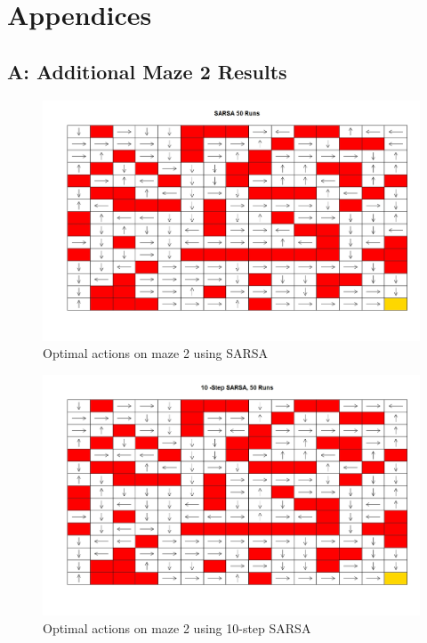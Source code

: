 \documentclass[final,12pt,3p]{elsarticle}
\begin{document}
\newpage

\section{Appendices}
\subsection{A: Additional Maze 2 Results}

\begin{figure}[H]
    \centering
    \caption{Optimal actions on maze 2 using SARSA}
    \includegraphics[width=13cm]{figures/Maps/Maze2/SARSAMapMaze2.jpeg}
\end{figure}

\begin{figure}[H]
    \centering
    \caption{Optimal actions on maze 2 using 10-step SARSA}
    \includegraphics[width=13cm]{figures/Maps/Maze2/10StepSARSAMapMaze2.jpeg}
\end{figure}
\end{document}
